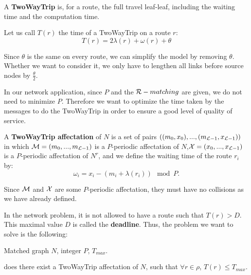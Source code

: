 \documentclass[a4paper,10pt]{article}
\begin{document}
    A {\bf TwoWayTrip} is, for a route, the full travel leaf-leaf, including the waiting time and the computation time.

    Let us call $T (r)$ the time of a TwoWayTrip on a route $r$: $$ T (r) = 2\lambda (r) + \omega (r) + \theta$$

    Since $\theta$ is the same on every route, we can simplify the model by removing $\theta$. Whether we want to consider it, we only have to lengthen all 
    links before source nodes by $\frac{\theta}{2}$. 


    In our network application, since $P$ and the ${\cal R}-matching$ are given, we do not need to minimize $P$.
    Therefore we want to optimize the time taken by the messages to do the TwoWayTrip in order to ensure a good level of quality of service.

    A {\bf TwoWayTrip affectation} of $N$ is a set of pairs $ ((m_0,x_0),...,(m_{{\cal L}-1},x_{{\cal L}-1}))$ in which ${\cal M} = (m_0,...,m_{{\cal L}-1})$ 
    is a $P$-periodic affectation of $N$,${\cal X} = (x_0,...,x_{{\cal L}-1})$ is a $P$-periodic affectation of $N^r$, and we define the waiting time of the route $r_i$ by:
    $$ \omega_i = x_i - (m_i + \lambda(r_i)) \mod P .$$ 

    Since ${\cal M}$ and ${\cal X}$ are some $P$-periodic affectation, they must have no collisions as we have already defined.



    In the network problem, it is not allowed to have a route such that $T(r) > D$. This maximal value $D$ is called the {\bf deadline}.
    Thus, the problem we want to solve is the following:\\


     Matched graph $N$, integer $P$, $ T_{max}$.

     does there exist a TwoWayTrip affectation of $N$, such that $\forall r \in \rho$, $T(r) \le T_{max}$.
\end{document}
